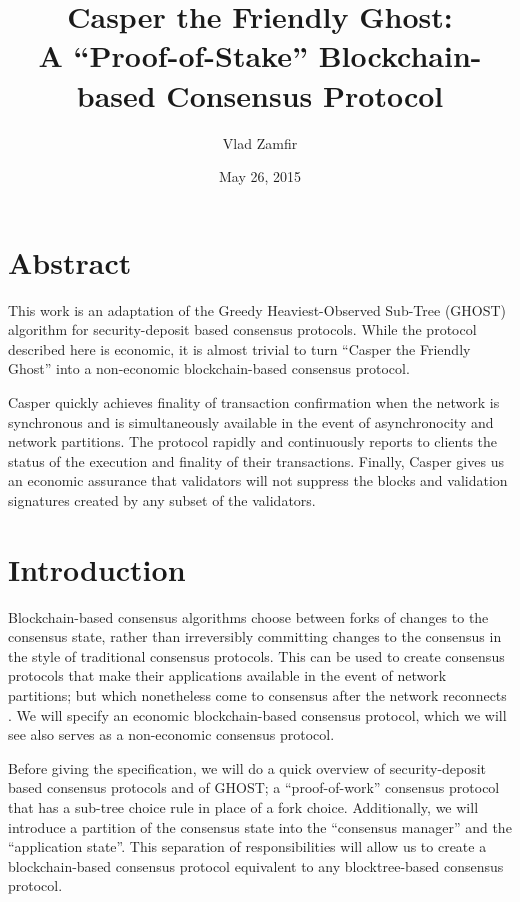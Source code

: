 \documentclass[11pt,a4paper]{article}
\title{Casper the Friendly Ghost: \\
		\vspace{2.5mm}
		\small A ``Proof-of-Stake'' Blockchain-based Consensus Protocol}
\date{May 26, 2015}
\author{Vlad Zamfir}
\begin{document}
\maketitle

\tableofcontents

\pagebreak

\section{Abstract}

This work is an adaptation of the Greedy Heaviest-Observed Sub-Tree\cite{GHOST} (GHOST) algorithm for security-deposit based consensus protocols. While the protocol described here is economic, it is almost trivial to turn ``Casper the Friendly Ghost'' into a non-economic blockchain-based consensus protocol. 

Casper quickly achieves finality of transaction confirmation when the network is synchronous and is simultaneously available in the event of asynchronocity and network partitions. The protocol rapidly and continuously reports to clients the status of the execution and finality of their transactions. Finally, Casper gives us an economic assurance that validators will not suppress the blocks and validation signatures created by any subset of the validators.


\section{Introduction}

Blockchain-based consensus algorithms choose between forks of changes to the consensus state, rather than irreversibly committing changes to the consensus in the style of traditional consensus protocols. This can be used to create consensus protocols that make their applications available in the event of network partitions; but which nonetheless come to consensus after the network reconnects \cite{ReformalizingConsensus}. We will specify an economic blockchain-based consensus protocol, which we will see also serves as a non-economic consensus protocol.

Before giving the specification, we will do a quick overview of security-deposit based consensus protocols and of GHOST; a ``proof-of-work'' consensus protocol that has a sub-tree choice rule in place of a fork choice. Additionally, we will introduce a partition of the consensus state into the ``consensus manager'' and the ``application state''. This separation of responsibilities will allow us to create a blockchain-based consensus protocol equivalent to any blocktree-based consensus protocol.
\end{document}
